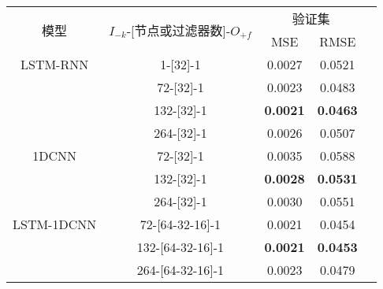 \begin{table}[!htbp]
  \centering
  \label{tab:ss_area_out_1}
  \footnotesize
  \renewcommand{\arraystretch}{1}
  \begin{tabular}{ccccc}
    \toprule
    \multirow{2}{*}{模型} & \multirow{2}{*}{$I_{-k}$-[节点或过滤器数]-$O_{+f}$} & \multicolumn{2}{c}{验证集}\\
    \cmidrule(lr){3-4}
    \noalign{\smallskip}
    & & MSE & RMSE\\
    \midrule 
    LSTM-RNN & 1-[32]-1 & 0.0027 & 0.0521 \\
     & 72-[32]-1 & 0.0023 & 0.0483 \\
     & 132-[32]-1 & \textbf{0.0021} & \textbf{0.0463} \\
     & 264-[32]-1 & 0.0026 & 0.0507 \\
    \hline
    1DCNN & 72-[32]-1 & 0.0035 & 0.0588 \\
     & 132-[32]-1 & \textbf{0.0028} & \textbf{0.0531} \\
     & 264-[32]-1 & 0.0030 & 0.0551 \\
    \hline
    LSTM-1DCNN & 72-[64-32-16]-1 & 0.0021 & 0.0454 \\
     & 132-[64-32-16]-1 & \textbf{0.0021} & \textbf{0.0453} \\
     & 264-[64-32-16]-1 & 0.0023 & 0.0479 \\
    \bottomrule
\end{tabular}
\end{table}

